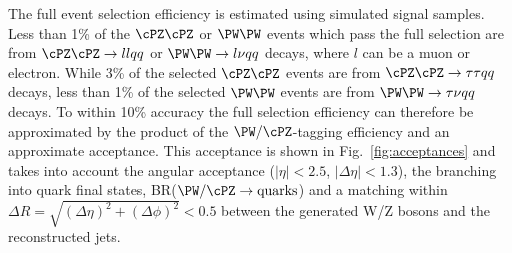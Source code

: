 \iffalse

The full event selection efficiency is estimated using simulated
signal samples.
Less than 1\% of the $\cPZ\cPZ$ or $\PW\PW$ events which pass the full
selection are from $\cPZ\cPZ \to ll qq$ or $\PW\PW \to l\nu qq$
decays, where $l$ can be a muon or electron.  While 3\% of the
selected $\cPZ\cPZ$ events are from $\cPZ\cPZ \to \tau\tau qq$ decays,
less than 1\% of the selected $\PW\PW$ events are from $\PW\PW \to
\tau\nu qq$ decays.
To within 10\% accuracy the full selection efficiency can
therefore be
approximated by the product of the $\PW/\cPZ$-tagging efficiency
and an approximate acceptance.
This acceptance is shown in Fig.~\ref{fig:acceptances} and
takes into account the angular acceptance
($|\eta| < 2.5$, $|\Delta\eta|<1.3$),
the branching into quark final states,
BR($\PW/\cPZ \to \text{quarks}$) and a matching within
$\Delta R = \sqrt{(\Delta \eta)^2 + (\Delta\phi)^2} <0.5$
between the generated W/Z bosons and the reconstructed jets.


